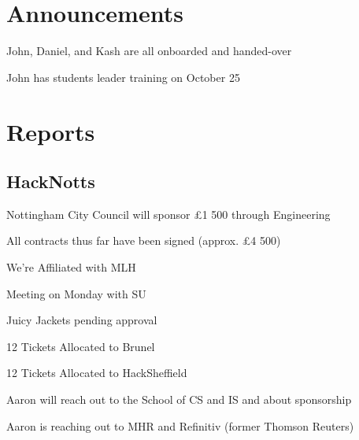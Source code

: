 \documentclass[11pt,hacksoc]{meetingmins}
\begin{document}
\maketitle

\section{Announcements}
\begin{items}
	\item
	John, Daniel, and Kash are all onboarded and handed-over
	
	\item
	John has students leader training on October 25

\end{items}

\section{Reports}

\subsection{HackNotts}
\begin{hiddensubitems}
	\item
	Nottingham City Council will sponsor \pounds 1 500 through Engineering
	
	\item
	All contracts thus far have been signed (approx. \pounds4 500)
	
	\item
	We're Affiliated with MLH
	
	\item
	Meeting on Monday with SU
	
	\item
	Juicy Jackets pending approval
	
	\item
	12 Tickets Allocated to Brunel
	
	\item
	12 Tickets Allocated to HackSheffield
	
	\item
	Aaron will reach out to the School of CS and IS and about sponsorship
	
	\item
	Aaron is reaching out to MHR and Refinitiv (former Thomson Reuters)
\end{hiddensubitems}
\end{document}
